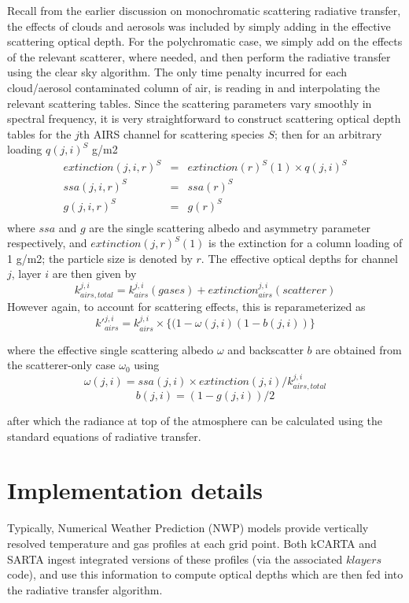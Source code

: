 \documentclass[11pt]{article}
\newcommand{\kc}{\textsf{kCARTA}\xspace}
\newcommand{\sa}{\textsf{SARTA}\xspace}
\begin{document}
Recall from the earlier discussion on monochromatic scattering radiative transfer, the effects of clouds and 
aerosols was included by simply 
adding in the effective scattering optical depth. For the polychromatic case, we simply add on the effects of the 
relevant scatterer, where needed, and then perform the radiative transfer using the clear sky algorithm. The only time 
penalty incurred for each cloud/aerosol contaminated column of air, is reading in and interpolating the relevant 
scattering tables. Since the scattering parameters vary smoothly in spectral frequency, it is very straightforward to 
construct scattering optical depth tables for the $j$th AIRS channel for scattering species $S$; then for an arbitrary 
loading $q(j,i)^{S}$ g/m2
 \begin{eqnarray*}
  extinction(j,i,r)^{S} & = &  extinction(r)^{S}(1) \times  q(j,i)^{S} \\
  ssa(j,i,r)^{S} & = &  ssa(r)^{S} \\
  g(j,i,r)^{S} & = &  g(r)^{S} \\
\end{eqnarray*}
where $ssa$ and $g$ are the single scattering albedo and asymmetry parameter respectively, and $extinction(j,r)^{S}(1)$ 
is the extinction for a column loading of 1 g/m2; the particle size is denoted by $r$. The effective optical depths for 
channel $j$, layer $i$ are then given by
\[
   k_{airs,total}^{j,i} = k_{airs}^{j,i}(gases) + extinction_{airs}^{j,i}(scatterer)
\]
However again, to account for scattering effects, this is reparameterized as
\[
k\prime_{airs}^{j,i} = k_{airs}^{j,i} \times \{ (1-\omega(j,i) (1-b(j,i)) \}
\]

where the effective single scattering albedo $\omega$ and backscatter $b$ are
obtained from the scatterer-only case $\omega_{0}$ using
\[
\omega(j,i) = ssa(j,i) \times extinction(j,i)/k_{airs,total}^{j,i}
\]
\[
b(j,i)      = (1 - g(j,i))/2
\]

after which the radiance at top of the atmosphere can be calculated using the standard equations of radiative transfer.

\section{Implementation details}

Typically, Numerical Weather Prediction (NWP) models provide vertically resolved temperature and gas profiles at each 
grid point. Both \kc and \sa ingest integrated versions of these profiles (via the associated $klayers$ code), and use 
this information to compute optical depths which are then fed into the radiative transfer algorithm.
\end{document}

